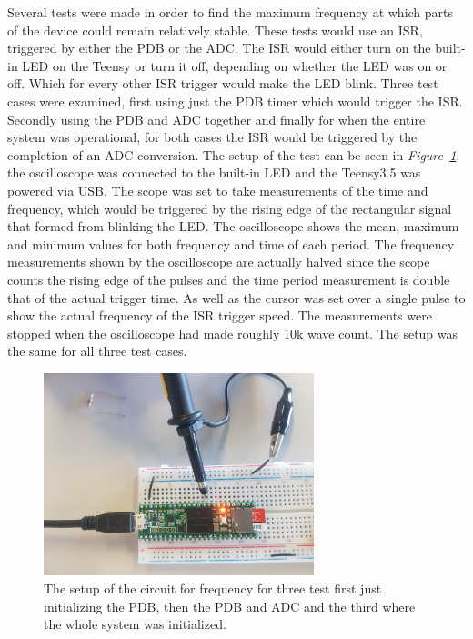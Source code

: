 Several tests were made in order to find the maximum frequency at which parts of the device could remain relatively stable.
These tests would use an ISR, triggered by either the PDB or the ADC.
The ISR would either turn on the built-in LED on the Teensy or turn it off, depending on whether the LED was on or off.
Which for every other ISR trigger would make the LED blink.
Three test cases were examined, first using just the PDB timer which would trigger the ISR. 
Secondly using the PDB and ADC together and finally for when the entire system was operational, for both cases the ISR would be triggered by the completion of an ADC conversion.
The setup of the test can be seen in \textit{Figure~\ref{fig:SetupCircSpeed}}, the oscilloscope was connected to the built-in LED and the Teensy3.5 was powered via USB. %
The scope was set to take measurements of the time and frequency, which would be triggered by the rising edge of the rectangular signal that formed from blinking the LED. 
The oscilloscope shows the mean, maximum and minimum values for both frequency and time of each period.
The frequency measurements shown by the oscilloscope are actually halved since the scope counts the rising edge of the pulses and the time period measurement is double that of the actual trigger time.
As well as the cursor was set over a single pulse to show the actual frequency of the ISR trigger speed.
The measurements were stopped when the oscilloscope had made roughly 10k wave count.
The setup was the same for all three test cases.


\begin{figure}[h]
    \centering
    \includegraphics[width=0.7\textwidth]{graphics/SetupCircSpeed.jpg}
    \caption{The setup of the circuit for frequency for three test first just initializing the PDB, then the PDB and ADC and the third where the whole system was initialized.}
    \label{fig:SetupCircSpeed}
\end{figure}

